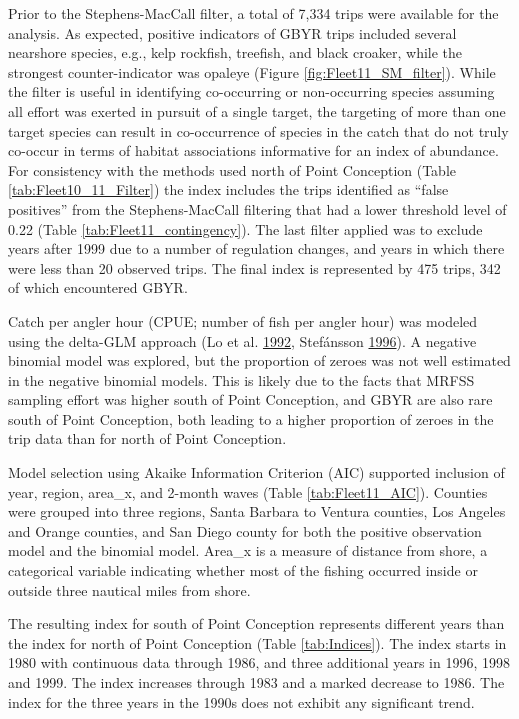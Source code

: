 \documentclass[12pt,]{article}
\begin{document}
Prior to the Stephens-MacCall filter, a total of 7,334 trips were
available for the analysis. As expected, positive indicators of GBYR
trips included several nearshore species, e.g., kelp rockfish, treefish,
and black croaker, while the strongest counter-indicator was opaleye
(Figure \ref{fig:Fleet11_SM_filter}). While the filter is useful in
identifying co-occurring or non-occurring species assuming all effort
was exerted in pursuit of a single target, the targeting of more than
one target species can result in co-occurrence of species in the catch
that do not truly co-occur in terms of habitat associations informative
for an index of abundance. For consistency with the methods used north
of Point Conception (Table \ref{tab:Fleet10_11_Filter}) the index
includes the trips identified as ``false positives'' from the
Stephens-MacCall filtering that had a lower threshold level of 0.22
(Table \ref{tab:Fleet11_contingency}). The last filter applied was to
exclude years after 1999 due to a number of regulation changes, and
years in which there were less than 20 observed trips. The final index
is represented by 475 trips, 342 of which encountered GBYR.

Catch per angler hour (CPUE; number of fish per angler hour) was modeled
using the delta-GLM approach (Lo et al.
\protect\hyperlink{ref-Lo1992}{1992}, Stefánsson
\protect\hyperlink{ref-Stefansson1996}{1996}). A negative binomial model
was explored, but the proportion of zeroes was not well estimated in the
negative binomial models. This is likely due to the facts that MRFSS
sampling effort was higher south of Point Conception, and GBYR are also
rare south of Point Conception, both leading to a higher proportion of
zeroes in the trip data than for north of Point Conception.

Model selection using Akaike Information Criterion (AIC) supported
inclusion of year, region, area\_x, and 2-month waves (Table
\ref{tab:Fleet11_AIC}). Counties were grouped into three regions, Santa
Barbara to Ventura counties, Los Angeles and Orange counties, and San
Diego county for both the positive observation model and the binomial
model. Area\_x is a measure of distance from shore, a categorical
variable indicating whether most of the fishing occurred inside or
outside three nautical miles from shore.

The resulting index for south of Point Conception represents different
years than the index for north of Point Conception (Table
\ref{tab:Indices}). The index starts in 1980 with continuous data
through 1986, and three additional years in 1996, 1998 and 1999. The
index increases through 1983 and a marked decrease to 1986. The index
for the three years in the 1990s does not exhibit any significant trend.
\end{document}
